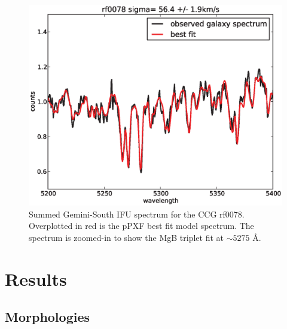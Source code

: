 \documentclass[iop,apj]{emulateapj}
\begin{document}
\begin{figure}[hbpt!]
\begin{center}
\includegraphics[scale=0.4]{rf0078ppxffit.eps}
\caption{Summed Gemini-South IFU spectrum for the CCG rf0078. Overplotted in red is the pPXF best fit model spectrum. The spectrum is zoomed-in to show the MgB triplet fit at $\sim 5275$ \AA.}
\label{fig:ppxffit}
\end{center}
\end{figure}

\section{Results}
\label{results}

\subsection{Morphologies}
\label{morph}
\end{document}

